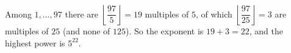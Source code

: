 Among $1,\dots,97$ there are $\left\lfloor\dfrac{97}{5}\right\rfloor=19$ multiples of $5$, of which $\left\lfloor\dfrac{97}{25}\right\rfloor=3$ are multiples of $25$ (and none of $125$). So the exponent is $19+3=22$, and the highest power is $\boxed{5^{22}}$.
